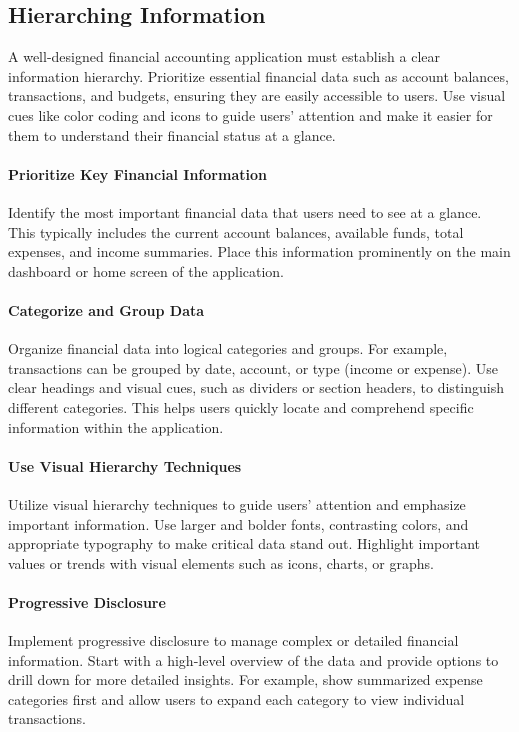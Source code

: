 \subsection{Hierarching Information}

A well-designed financial accounting application must establish a clear information hierarchy. Prioritize essential 
financial data such as account balances, transactions, and budgets, ensuring they are easily accessible to users. 
Use visual cues like color coding and icons to guide users' attention and make it easier for them to understand 
their financial status at a glance.

\paragraph{Prioritize Key Financial Information}
Identify the most important financial data that users need to see at a glance. 
This typically includes the current account balances, available funds, total expenses, and income summaries. Place 
this information prominently on the main dashboard or home screen of the application.

\paragraph{Categorize and Group Data}
Organize financial data into logical categories and groups. For example, transactions can 
be grouped by date, account, or type (income or expense). Use clear headings and visual cues, such as dividers or 
section headers, to distinguish different categories. This helps users quickly locate and comprehend specific 
information within the application.

\paragraph{Use Visual Hierarchy Techniques}
Utilize visual hierarchy techniques to guide users' attention and emphasize important 
information. Use larger and bolder fonts, contrasting colors, and appropriate typography to make critical data 
stand out. Highlight important values or trends with visual elements such as icons, charts, or graphs.

\paragraph{Progressive Disclosure}
Implement progressive disclosure to manage complex or detailed financial information. Start 
with a high-level overview of the data and provide options to drill down for more detailed insights. For example, 
show summarized expense categories first and allow users to expand each category to view individual transactions.

